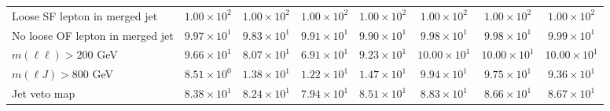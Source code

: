 \begin{table}[htp]
{\begin{tabular}{l | c c c c | c c c}
      Loose SF lepton in merged jet & $1.00 \times 10^{2}$ & $1.00 \times 10^{2}$ & $1.00 \times 10^{2}$ & $1.00 \times 10^{2}$ & $1.00 \times 10^{2}$ & $1.00 \times 10^{2}$ & $1.00 \times 10^{2}$ \\
      No loose OF lepton in merged jet & $9.97 \times 10^{1}$ & $9.83 \times 10^{1}$ & $9.91 \times 10^{1}$ & $9.90 \times 10^{1}$ & $9.98 \times 10^{1}$ & $9.98 \times 10^{1}$ & $9.99 \times 10^{1}$ \\
      $m(\ell\ell) > 200$ GeV & $9.66 \times 10^{1}$ & $8.07 \times 10^{1}$ & $6.91 \times 10^{1}$ & $9.23 \times 10^{1}$ & $10.00 \times 10^{1}$ & $10.00 \times 10^{1}$ & $10.00 \times 10^{1}$ \\
      $m(\ell J) > 800$ GeV & $8.51 \times 10^{0}$ & $1.38 \times 10^{1}$ & $1.22 \times 10^{1}$ & $1.47 \times 10^{1}$ & $9.94 \times 10^{1}$ & $9.75 \times 10^{1}$ & $9.36 \times 10^{1}$ \\
      Jet veto map & $8.38 \times 10^{1}$ & $8.24 \times 10^{1}$ & $7.94 \times 10^{1}$ & $8.51 \times 10^{1}$ & $8.83 \times 10^{1}$ & $8.66 \times 10^{1}$ & $8.67 \times 10^{1}$ \\
      \hline
    \end{tabular}
  }
\end{table}

